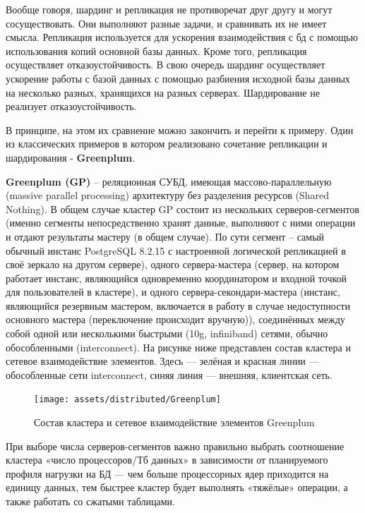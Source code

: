 Вообще говоря, шардинг и репликация не противоречат друг другу и могут сосуществовать. Они выполняют разные задачи, и
сравнивать их не имеет смысла. Репликация используется для ускорения взаимодействия с бд с помощью использования копий
основной базы данных. Кроме того, репликация осуществляет отказоустойчивость. В свою очередь шардинг осуществляет
ускорение работы с базой данных с помощью разбиения исходной базы данных на несколько разных, хранящихся на разных
серверах.  Шардирование не реализует отказоустойчивость.

В принципе, на этом их сравнение можно закончить и перейти к примеру. Один из классических примеров в котором
реализовано сочетание репликации и шардирования - \textbf{Greenplum}.

\textbf{Greenplum (GP)} – реляционная СУБД, имеющая массово-параллельную (massive parallel processing) архитектуру без
разделения ресурсов (Shared Nothing). В общем случае кластер GP состоит из нескольких серверов-сегментов (именно
сегменты непосредственно хранят данные, выполняют с ними операции и отдают результаты мастеру (в общем случае). По сути
сегмент – самый обычный инстанс PostgreSQL 8.2.15 с настроенной логической репликацией в своё зеркало на другом
сервере), одного сервера-мастера (сервер, на котором работает инстанс, являющийся одновременно координатором и входной
точкой для пользователей в кластере), и одного сервера-секондари-мастера (инстанс, являющийся резервным мастером,
включается в работу в случае недоступности основного мастера (переключение происходит вручную)), соединённых между
собой одной или несколькими быстрыми (10g, infiniband) сетями, обычно обособленными (interconnect). На рисунке ниже
представлен состав кластера и сетевое взаимодействие элементов. Здесь — зелёная и красная линии — обособленные сети
interconnect, синяя линия — внешняя, клиентская сеть.

\begin{figure}[H]
    \centering
    \texttt{[image: assets/distributed/Greenplum]}
    \caption{Состав кластера и сетевое взаимодействие элементов Greenplum}
    \label{fig:Greenplum}
\end{figure}

При выборе числа серверов-сегментов важно правильно выбрать соотношение кластера «число процессоров/Тб данных» в
зависимости от планируемого профиля нагрузки на БД — чем больше процессорных ядер приходится на единицу данных, тем
быстрее кластер будет выполнять «тяжёлые» операции, а также работать со сжатыми таблицами.

